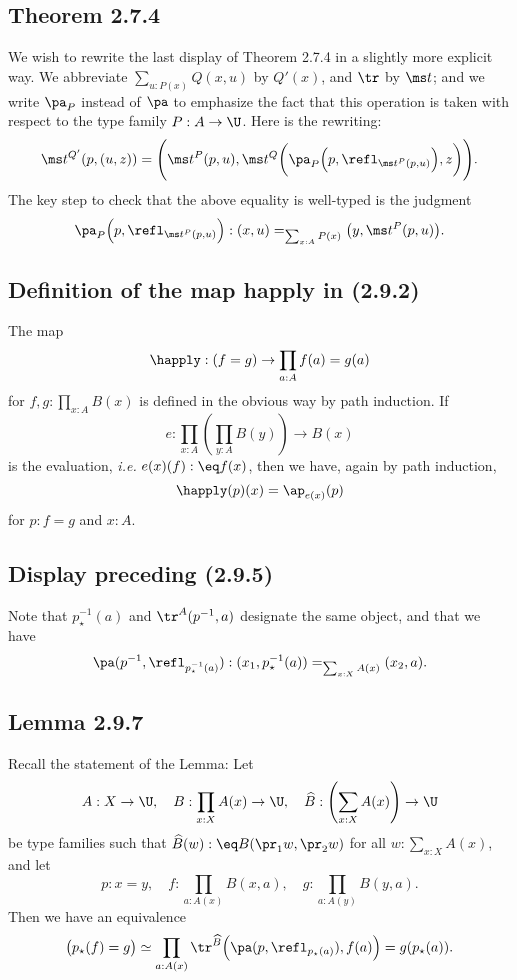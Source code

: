 \documentclass[12pt]{article}
\begin{document}

\subsection{Theorem 2.7.4}\label{274}

We wish to rewrite the last display of Theorem 2.7.4 in a slightly more explicit way. We abbreviate $\sum_{u:P(x)}Q(x,u)$ by $Q'(x)$, and $\tr$ by $\ms t$; and we write $\pa_P$ instead of $\pa$ to emphasize the fact that this operation is taken with respect to the type family $P:A\to\U$. Here is the rewriting:
$$
\ms t^{Q'}(p,(u,z))=\Bigg(\ms t^P(p,u),\ms t^Q\bigg(\pa_P\Big(p,\refl_{\ms t^P(p,u)}\Big),z\bigg)\Bigg).
$$ 
The key step to check that the above equality is well-typed is the judgment 
$$
\pa_P\Big(p,\refl_{\ms t^P(p,u)}\Big):(x,u)=_{\sum_{x:A}P(x)}\big(y,\ms t^P(p,u)\big).
$$ 


\subsection{Definition of the map \textsf{happly} in (2.9.2)}

The map 
$$
\happly:(f=g)\to\prod_{a:A}f(a)=g(a)
$$ 
for $f,g:\prod_{x:A}B(x)$ is defined in the obvious way by path induction. If 
$$
e:\prod_{x:A}\left(\prod_{y:A}B(y)\right)\to B(x)
$$ 
is the evaluation, \emph{i.e.} $e(x)(f):\eq f(x)$, then we have, again by path induction, 
$$
\happly(p)(x)=\ap_{e(x)}(p)
$$ 
for $p:f=g$ and $x:A$. 


\subsection{Display preceding (2.9.5)}

Note that $p^{-1}_\star(a)$ and $\tr^A(p^{-1},a)$ designate the same object, and that we have 
$$
\pa(p^{-1},\refl_{p^{-1}_\star(a)}):(x_1,p^{-1}_\star(a))=_{\sum_{x:X}A(x)}(x_2,a).
$$ 


\subsection{Lemma 2.9.7}

Recall the statement of the Lemma: Let 
$$
A:X\to\U,\quad B:\prod_{x:X}A(x)\to\U,\quad\widehat B:\left(\sum_{x:X}A(x)\right)\to\U
$$ 
be type families such that $\widehat B(w):\eq B(\pr_1w,\pr_2w)$ for all $w:\sum_{x:X}A(x)$, and let 
$$
p:x=y,\quad f:\prod_{a:A(x)}B(x,a),\quad g:\prod_{a:A(y)}B(y,a).
$$ 
Then we have an equivalence 
$$
\big(p_\star(f)=g\big)\simeq\prod_{a:A(x)}\tr^{\widehat B}\Big(\pa(p,\refl_{p_\star(a)}),f(a)\Big)=g(p_\star(a)).
$$ 
\end{document}
